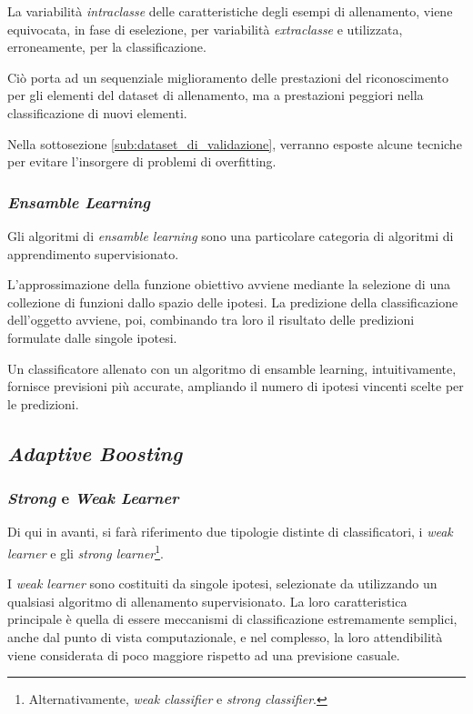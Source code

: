                 La variabilità \emph{intraclasse} delle caratteristiche degli esempi di allenamento, viene equivocata, in fase di eselezione, per variabilità \emph{extraclasse} e utilizzata, erroneamente, per la classificazione.

                Ciò porta ad un sequenziale miglioramento delle prestazioni del riconoscimento per gli elementi del dataset di allenamento, ma a prestazioni peggiori nella classificazione di nuovi elementi.

                Nella sottosezione \ref{sub:dataset_di_validazione}, verranno esposte alcune tecniche per evitare l'insorgere di problemi di overfitting.

            \subsubsection{\emph{Ensamble Learning}}
                Gli algoritmi di \emph{ensamble learning} sono una particolare categoria di algoritmi di apprendimento supervisionato.

                L'approssimazione della funzione obiettivo avviene mediante la selezione di una collezione di funzioni dallo spazio delle ipotesi.
                La predizione della classificazione dell'oggetto avviene, poi, combinando tra loro il risultato delle predizioni formulate dalle singole ipotesi.
                
                Un classificatore allenato con un algoritmo di ensamble learning, intuitivamente, fornisce previsioni più accurate, ampliando il numero di ipotesi vincenti scelte per le predizioni.

        \subsection{\emph{Adaptive Boosting}}
        \label{sub:adaptive_boosting}
            \subsubsection{\emph{Strong} e \emph{Weak Learner}}
                Di qui in avanti, si farà riferimento due tipologie distinte di classificatori, i \emph{weak learner} e gli \emph{strong learner}\footnote{Alternativamente, \emph{weak classifier} e \emph{strong classifier}.}.

                I \emph{weak learner} sono costituiti da singole ipotesi, selezionate da utilizzando un qualsiasi algoritmo di allenamento supervisionato.
                La loro caratteristica principale è quella di essere meccanismi di classificazione estremamente semplici, anche dal punto di vista computazionale, e nel complesso, la loro attendibilità viene considerata di poco maggiore rispetto ad una previsione casuale.

